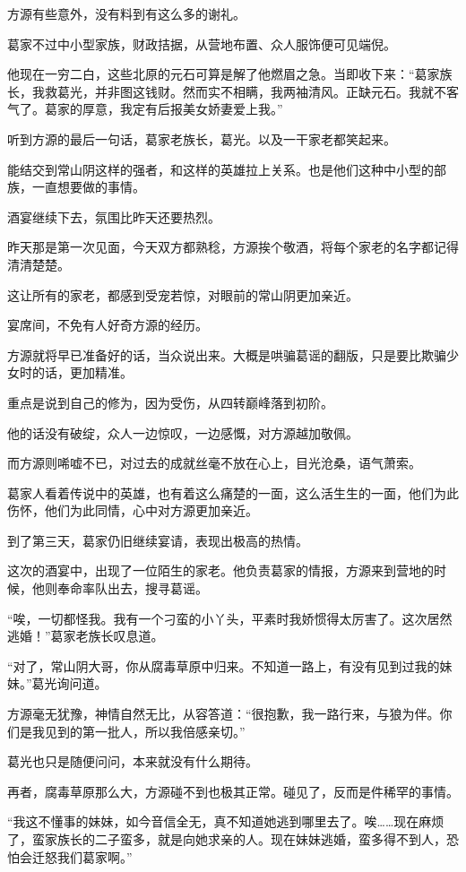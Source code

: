 \begin{this_body}
方源有些意外，没有料到有这么多的谢礼。

葛家不过中小型家族，财政拮据，从营地布置、众人服饰便可见端倪。

他现在一穷二白，这些北原的元石可算是解了他燃眉之急。当即收下来：“葛家族长，我救葛光，并非图这钱财。然而实不相瞒，我两袖清风。正缺元石。我就不客气了。葛家的厚意，我定有后报美女娇妻爱上我。”

听到方源的最后一句话，葛家老族长，葛光。以及一干家老都笑起来。

能结交到常山阴这样的强者，和这样的英雄拉上关系。也是他们这种中小型的部族，一直想要做的事情。

酒宴继续下去，氛围比昨天还要热烈。

昨天那是第一次见面，今天双方都熟稔，方源挨个敬酒，将每个家老的名字都记得清清楚楚。

这让所有的家老，都感到受宠若惊，对眼前的常山阴更加亲近。

宴席间，不免有人好奇方源的经历。

方源就将早已准备好的话，当众说出来。大概是哄骗葛谣的翻版，只是要比欺骗少女时的话，更加精准。

重点是说到自己的修为，因为受伤，从四转巅峰落到初阶。

他的话没有破绽，众人一边惊叹，一边感慨，对方源越加敬佩。

而方源则唏嘘不已，对过去的成就丝毫不放在心上，目光沧桑，语气萧索。

葛家人看着传说中的英雄，也有着这么痛楚的一面，这么活生生的一面，他们为此伤怀，他们为此同情，心中对方源更加亲近。

到了第三天，葛家仍旧继续宴请，表现出极高的热情。

这次的酒宴中，出现了一位陌生的家老。他负责葛家的情报，方源来到营地的时候，他则奉命率队出去，搜寻葛谣。

“唉，一切都怪我。我有一个刁蛮的小丫头，平素时我娇惯得太厉害了。这次居然逃婚！”葛家老族长叹息道。

“对了，常山阴大哥，你从腐毒草原中归来。不知道一路上，有没有见到过我的妹妹。”葛光询问道。

方源毫无犹豫，神情自然无比，从容答道：“很抱歉，我一路行来，与狼为伴。你们是我见到的第一批人，所以我倍感亲切。”

葛光也只是随便问问，本来就没有什么期待。

再者，腐毒草原那么大，方源碰不到也极其正常。碰见了，反而是件稀罕的事情。

“我这不懂事的妹妹，如今音信全无，真不知道她逃到哪里去了。唉……现在麻烦了，蛮家族长的二子蛮多，就是向她求亲的人。现在妹妹逃婚，蛮多得不到人，恐怕会迁怒我们葛家啊。”


\end{this_body}
